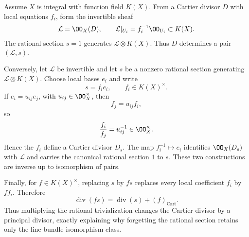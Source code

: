 \begin{solution}
Assume \(X\) is integral with function field \(K(X)\).  From a Cartier divisor \(D\) with local equations \(f_i\), form the invertible sheaf
\[
\mathcal L=\OO_X(D),
\qquad
\mathcal L|_{U_i}=f_i^{-1}\OO_{U_i}\subset K(X).
\]
The rational section \(s=1\) generates \(\mathcal L\otimes K(X)\).  Thus \(D\) determines a pair \((\mathcal L,s)\).

Conversely, let \(\mathcal L\) be invertible and let \(s\) be a nonzero rational section generating \(\mathcal L\otimes K(X)\).  Choose local bases \(e_i\) and write
\[
s=f_i e_i,
\qquad f_i\in K(X)^\times.
\]
If \(e_i=u_{ij}e_j\), with \(u_{ij}\in\OO_X^\times\), then
\[
f_j=u_{ij}f_i,
\]
so
\[
\frac{f_i}{f_j}=u_{ij}^{-1}\in\OO_X^\times.
\]
Hence the \(f_i\) define a Cartier divisor \(D_s\).  The map \(f_i^{-1}\mapsto e_i\) identifies \(\OO_X(D_s)\) with \(\mathcal L\) and carries the canonical rational section \(1\) to \(s\).  These two constructions are inverse up to isomorphism of pairs.

Finally, for \(f\in K(X)^\times\), replacing \(s\) by \(fs\) replaces every local coefficient \(f_i\) by \(ff_i\).  Therefore
\[
\operatorname{div}(fs)
=\operatorname{div}(s)+(f)_{\mathrm{Cart}}.
\]
Thus multiplying the rational trivialization changes the Cartier divisor by a principal divisor, exactly explaining why forgetting the rational section retains only the line-bundle isomorphism class.
\end{solution}
